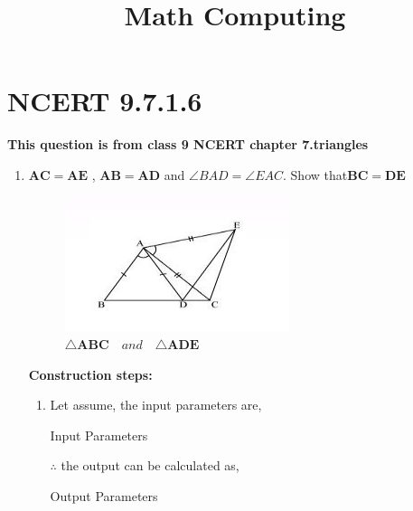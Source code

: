 \documentclass[11pt, a4paper]{article}
\title{ \textbf{Math Computing}}
\date{}
\let\vec\mathbf
\begin{document}
\vspace{-\baselineskip}
\maketitle

\section*{NCERT 9.7.1.6}

\textbf{This question is from class 9 NCERT chapter 7.triangles}
\begin{enumerate}
\item $\vec{AC} = \vec{AE}$ , $\vec{AB} = \vec{AD}$ and $\angle BAD = \angle EAC$. Show that$\vec{BC} = \vec{DE}$
	
\begin{figure}[H]
    \includegraphics[width=\columnwidth]{figs/ABCDE.png}
	\caption{$\triangle  \vec{ABC} \hspace{12pt} and \hspace{12pt} \triangle \vec{ADE}$}
 \label{fig:fig1}
\end{figure}
\pagebreak
\textbf{Construction steps:}
\\
		\begin{enumerate}[label=(\roman*)]

\item Let assume, the input parameters are, 
\begin{table}[H]
\centering
	
	  \caption{Input Parameters}
	  \label{Table-1: }
\end{table}

$\therefore$ the output can be calculated as,
\begin{table}[H]
\centering
	
	  \caption{Output Parameters}
	  \label{Table-2: }
\end{table}


\end{enumerate}
\end{enumerate}
\end{document}
